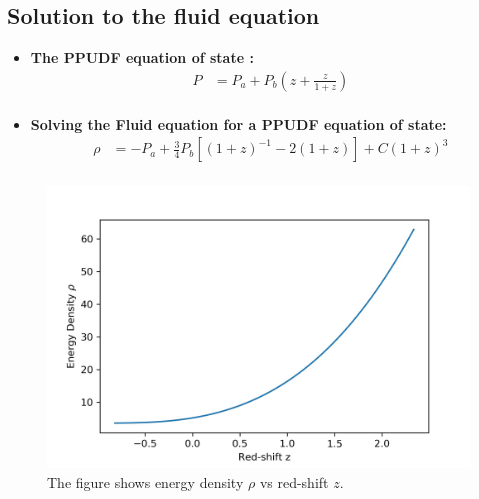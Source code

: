 \documentclass[8pt,hideothersubsections]{beamer}
\newcommand{\brac}[1]{\left(#1\right)}
\newcommand{\bracc}[1]{\left[#1\right]}
\begin{document}
\subsection{Solution to the fluid equation}
{
\begin{frame}
\begin{itemize}
\frametitle{\insertsectionhead}
\fontsize{7pt}{7.2}\selectfont
\item \textbf{The PPUDF equation of state \citep{wang2017new}:}
\begin{equation}\label{eq:UDFEoS}
\begin{split}
P &= P_{a}+P_{b}\brac{z+\frac{z}{1+z}}         \\
\end{split}
\end{equation}
\item \textbf{Solving the Fluid equation for a PPUDF equation of state:}
\begin{equation}\label{eq:UDFFluidSolZ}
\begin{split}
\rho&= -P_{a}+\frac{3}{4}P_{b}\bracc{\brac{1+z}^{-1}-2\brac{1+z}}+C\brac{1+z}^{3} \\
\end{split}
\end{equation}

\end{itemize}
\begin{figure}[h]
\centering
\includegraphics[scale=0.45]{Images/UDF_rho.jpg}
\caption{The figure shows energy density $\rho$ vs red-shift $z$.}
\label{fig:UDFRho}
\end{figure}
\end{frame}

}
\end{document}
